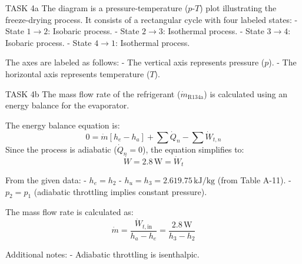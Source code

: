 TASK 4a  
The diagram is a pressure-temperature (\(p\)-\(T\)) plot illustrating the freeze-drying process. It consists of a rectangular cycle with four labeled states:  
- State \(1 \to 2\): Isobaric process.  
- State \(2 \to 3\): Isothermal process.  
- State \(3 \to 4\): Isobaric process.  
- State \(4 \to 1\): Isothermal process.  

The axes are labeled as follows:  
- The vertical axis represents pressure (\(p\)).  
- The horizontal axis represents temperature (\(T\)).  

TASK 4b  
The mass flow rate of the refrigerant (\( \dot{m}_{\text{R134a}} \)) is calculated using an energy balance for the evaporator.  

The energy balance equation is:  
\[
0 = \dot{m} \left[ h_e - h_a \right] + \sum \dot{Q}_n - \sum \dot{W}_{t,n}
\]  
Since the process is adiabatic (\( \dot{Q}_n = 0 \)), the equation simplifies to:  
\[
\dot{W} = 2.8 \, \text{W} = \dot{W}_t
\]  

From the given data:  
- \( h_e = h_2 \)  
- \( h_u = h_3 = 2.619.75 \, \text{kJ/kg} \) (from Table A-11).  
- \( p_2 = p_1 \) (adiabatic throttling implies constant pressure).  

The mass flow rate is calculated as:  
\[
\dot{m} = \frac{\dot{W}_{t,\text{in}}}{h_a - h_e} = \frac{2.8 \, \text{W}}{h_3 - h_2}
\]  

Additional notes:  
- Adiabatic throttling is isenthalpic.